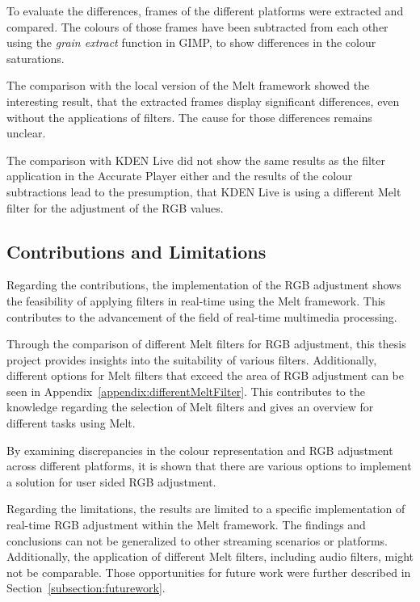 \documentclass[../MasterThesis.tex]{subfiles}
\begin{document}
To evaluate the differences, frames of the different platforms were extracted and compared. 
The colours of those frames have been subtracted from each other using the \textit{grain extract} function in GIMP, to show differences in the colour saturations.


The comparison with the local version of the Melt framework showed the interesting result, that the extracted frames display significant differences, even without the applications of filters. The cause for those differences remains unclear.

The comparison with KDEN Live did not show the same results as the filter application in the Accurate Player either and the results of the colour subtractions lead to the presumption, that KDEN Live is using a different Melt filter for the adjustment of the RGB values.





\subsection{Contributions and Limitations} \label{subsection:contributionslimitations}



Regarding the contributions, the implementation of the RGB adjustment shows the feasibility of applying filters in real-time using the Melt framework.
This contributes to the advancement of the field of real-time multimedia processing.


Through the comparison of different Melt filters for RGB adjustment, this thesis project provides insights into the suitability of various filters. Additionally, different options for Melt filters that exceed the area of RGB adjustment can be seen in Appendix~\ref{appendix:differentMeltFilter}.
This contributes to the knowledge regarding the selection of Melt filters and gives an overview for different tasks using Melt.


By examining discrepancies in the colour representation and RGB adjustment across different platforms, it is shown that there are various options to implement a solution for user sided RGB adjustment.


Regarding the limitations, the results are limited to a specific implementation of real-time RGB adjustment within the Melt framework. The findings and conclusions can not be generalized to other streaming scenarios or platforms. Additionally, the application of different Melt filters, including audio filters, might not be comparable. Those opportunities for future work were further described in Section~\ref{subsection:futurework}.
\end{document}
